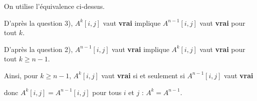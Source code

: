 \begin{Answer}On utilise l'équivalence ci-dessus.

D'après la question 3), $A^k[i, j]$ vaut {\bf vrai} implique $A^{n-1}[i, j]$ vaut {\bf vrai} pour tout $k$.

D'après la question 2), $A^{n-1}[i, j]$ vaut {\bf vrai} implique $A^k[i, j]$ vaut {\bf vrai} pour tout $k\ge n-1$.

Ainsi, pour $k\ge n-1$, $A^k[i, j]$ vaut {\bf vrai} si et seulement si $A^{n-1}[i, j]$ vaut {\bf vrai}  

donc $A^k[i, j] = A^{n-1}[i, j]$ pour tous $i$ et $j$ : $A^k =A^{n-1}$.
\end{Answer}
